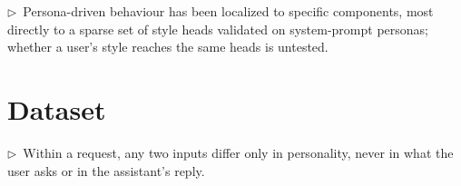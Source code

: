 \documentclass[11pt]{article}
\newcommand{\flow}[1]{\par\noindent\textcolor{blue!60!black}{\small$\triangleright$\ #1}\par\medskip}
\begin{document}
\flow{Persona-driven behaviour has been localized to specific components, most directly to a sparse set of style heads validated on system-prompt personas; whether a user's style reaches the same heads is untested.}

\section{Dataset}

\flow{Within a request, any two inputs differ only in personality, never in what the user asks or in the assistant's reply.}
\end{document}
